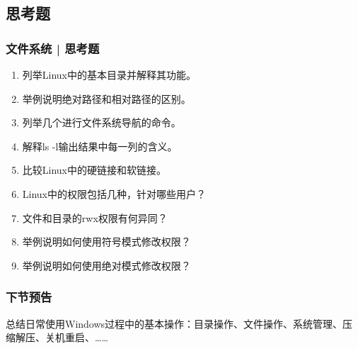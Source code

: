 \subsection{思考题}
\begin{frame}
  \frametitle{文件系统 | 思考题}
  \begin{enumerate}
    \item 列举Linux中的基本目录并解释其功能。
    \item 举例说明绝对路径和相对路径的区别。
    \item 列举几个进行文件系统导航的命令。
    \item 解释ls -l输出结果中每一列的含义。
    \item 比较Linux中的硬链接和软链接。
    \item Linux中的权限包括几种，针对哪些用户？
    \item 文件和目录的rwx权限有何异同？
    \item 举例说明如何使用符号模式修改权限？
    \item 举例说明如何使用绝对模式修改权限？
  \end{enumerate}
\end{frame}

\begin{frame}
  \frametitle{下节预告}
  总结日常使用Windows过程中的基本操作：目录操作、文件操作、系统管理、压缩解压、关机重启、……
\end{frame}




